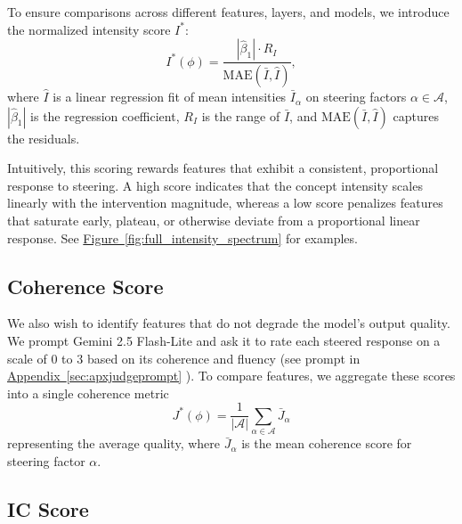 \documentclass{article}
\theoremstyle{plain}
\theoremstyle{definition}
\theoremstyle{remark}
\newcommand{\myref}[2]{%
    \hyperref[#2]{#1~\ref*{#2}}%
}
\begin{document}
To ensure comparisons across different features, layers, and models, we introduce the normalized intensity score $I^*$:
\begin{equation}
    I^*(\phi) = \frac{|\hat{\beta}_1| \cdot R_I}{\text{MAE}(\bar{I}, \widehat{I})},
\end{equation}
where $\widehat{I}$ is a linear regression fit of mean intensities $\bar{I}_{\alpha}$ on steering factors $\alpha \in \mathcal{A}$, $|\hat{\beta}_1|$ is the regression coefficient, $R_I$ is the range of $\bar{I}$, and $\text{MAE}(\bar{I}, \widehat{I})$ captures the residuals.

Intuitively, this scoring rewards features that exhibit a consistent, proportional response to steering. A high score indicates that the concept intensity scales linearly with the intervention magnitude, whereas a low score penalizes features that saturate early, plateau, or otherwise deviate from a proportional linear response. See \myref{Figure}{fig:full_intensity_spectrum} for examples.

\subsection{Coherence Score}

We also wish to identify features that do not degrade the model's output quality. We prompt Gemini 2.5 Flash-Lite \citep{comanici2025gemini25pushingfrontier} and ask it to rate each steered response on a scale of 0 to 3 based on its coherence and fluency (see prompt in \myref{Appendix}{sec:apxjudgeprompt}). To compare features, we aggregate these scores into a single coherence metric
\begin{equation}
    J^*(\phi) = \frac{1}{|\mathcal{A}|} \sum_{\alpha \in \mathcal{A}} \bar{J}_{\alpha}
\end{equation}
representing the average quality,
where $\bar{J}_{\alpha}$ is the mean coherence score for steering factor $\alpha$.

\subsection{IC Score}
\end{document}

